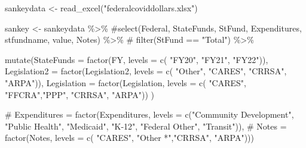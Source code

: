 \documentclass[
  letterpaper,
  DIV=11,
  numbers=noendperiod]{scrreport}
\newenvironment{Shaded}{\begin{snugshade}}{\end{snugshade}}
\newcommand{\AttributeTok}[1]{\textcolor[rgb]{0.40,0.45,0.13}{#1}}
\newcommand{\CommentTok}[1]{\textcolor[rgb]{0.37,0.37,0.37}{#1}}
\newcommand{\FunctionTok}[1]{\textcolor[rgb]{0.28,0.35,0.67}{#1}}
\newcommand{\NormalTok}[1]{\textcolor[rgb]{0.00,0.23,0.31}{#1}}
\newcommand{\OtherTok}[1]{\textcolor[rgb]{0.00,0.23,0.31}{#1}}
\newcommand{\SpecialCharTok}[1]{\textcolor[rgb]{0.37,0.37,0.37}{#1}}
\newcommand{\StringTok}[1]{\textcolor[rgb]{0.13,0.47,0.30}{#1}}
\begin{document}
\begin{Shaded}
\begin{Highlighting}[]
\NormalTok{sankeydata }\OtherTok{\textless{}{-}} \FunctionTok{read\_excel}\NormalTok{(}\StringTok{"federalcoviddollars.xlsx"}\NormalTok{)}

\NormalTok{sankey }\OtherTok{\textless{}{-}}\NormalTok{ sankeydata }\SpecialCharTok{\%\textgreater{}\%} 
  \CommentTok{\#select(Federal, StateFunds, StFund, Expenditures, stfundname, value, Notes) \%\textgreater{}\%}
  \CommentTok{\#  filter(StFund == "Total") \%\textgreater{}\%}

  \FunctionTok{mutate}\NormalTok{(}\AttributeTok{StateFunds =} \FunctionTok{factor}\NormalTok{(FY, }\AttributeTok{levels =} \FunctionTok{c}\NormalTok{( }\StringTok{"FY20"}\NormalTok{, }\StringTok{"FY21"}\NormalTok{, }\StringTok{"FY22"}\NormalTok{)),}
        \AttributeTok{Legislation2 =} \FunctionTok{factor}\NormalTok{(Legislation2, }\AttributeTok{levels =} \FunctionTok{c}\NormalTok{( }\StringTok{"Other"}\NormalTok{, }\StringTok{"CARES"}\NormalTok{, }\StringTok{"CRRSA"}\NormalTok{, }\StringTok{"ARPA"}\NormalTok{)),}
                              \AttributeTok{Legislation =} \FunctionTok{factor}\NormalTok{(Legislation, }\AttributeTok{levels =} \FunctionTok{c}\NormalTok{( }\StringTok{"CARES"}\NormalTok{, }\StringTok{"FFCRA"}\NormalTok{,}\StringTok{"PPP"}\NormalTok{, }\StringTok{"CRRSA"}\NormalTok{, }\StringTok{"ARPA"}\NormalTok{))}
\NormalTok{)}
         
                 \CommentTok{\#  Expenditures = factor(Expenditures, levels = c("Community Development", "Public Health", "Medicaid", "K{-}12", "Federal Other", "Transit")),}
      \CommentTok{\#   Notes = factor(Notes, levels = c(  "CARES", "Other *","CRRSA", "ARPA")))}



\end{Highlighting}
\end{Shaded}
\end{document}
